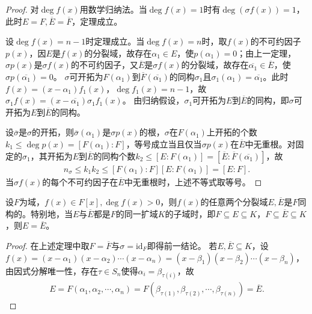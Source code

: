 \documentclass[../../main.tex]{subfiles}%
\begin{document}
\begin{proof}
对$\deg f(x)$用数学归纳法。当$\deg f(x)=1$时有$\deg(\sigma f(x))=1$，此时$E=F,\overline{E}=\overline{F}$，定理成立。

设$\deg f(x)=n-1$时定理成立。当$\deg f(x)=n$时，取$f(x)$的不可约因子$p(x)$，因$E$是$f(x)$的分裂域，故存在$\alpha_1\in E$，使$p(\alpha_1)=0$；由上一定理，$\sigma p(x)$是$\sigma f(x)$的不可约因子，又$\overline{E}$是$\sigma f(x)$的分裂域，故存在$\overline{\alpha_1}\in\overline{E}$，使$\sigma p(\overline{\alpha_1})=0$。
$\sigma$可开拓为$F(\alpha_1)$到$\overline{F}(\overline{\alpha_1})$的同构$\sigma_1$且$\sigma_1(\alpha_1)=\overline{\alpha_1}$。此时$f(x)=(x-\alpha_1)f_1(x)$，$\deg f_1(x)=n-1$，故$\sigma_1 f(x)=(x-\overline{\alpha_1})\sigma_1 f_1(x)$。
由归纳假设，$\sigma_1$可开拓为$E$到$\overline{E}$的同构，即$\sigma$可开拓为$E$到$\overline{E}$的同构。

设$\overline{\sigma}$是$\sigma$的开拓，则$\overline{\sigma}(\alpha_1)$是$\sigma p(x)$的根，$\sigma$在$F(\alpha_1)$上开拓的个数$k_1\leqslant\deg p(x)=[F(\alpha_1):F]$，等号成立当且仅当$\sigma p(x)$在$\overline{E}$中无重根。对固定的$\sigma_1$，其开拓为$E$到$\overline{E}$的同构个数$k_2\leqslant[E:F(\alpha_1)]=[\overline{E}:\overline{F}(\overline{\alpha_1})]$，故
\begin{align*}
n_\sigma\leqslant k_1k_2\leqslant[F(\alpha_1):F][E:F(\alpha_1)]=[E:F].
\end{align*}
当$\sigma f(x)$的每个不可约因子在$\overline{E}$中无重根时，上述不等式取等号。
\end{proof}

\begin{corollary}
设$F$为域，$f(x)\in F[x],\deg f(x)>0$，则$f(x)$的任意两个分裂域$E,\overline{E}$是$F$同构的。特别地，当$E$与$\overline{E}$都是$F$的同一扩域$K$的子域时，即$F\subseteq E\subseteq K$，$F\subseteq\overline{E}\subseteq K$，则$E=\overline{E}$。
\end{corollary}

\begin{proof}
在上述定理中取$F=\overline{F}$与$\sigma=\mathrm{id}_F$即得前一结论。
若$E,\overline{E}\subseteq K$，设$f(x)=(x-\alpha_1)(x-\alpha_2)\cdots(x-\alpha_n)=(x-\beta_1)(x-\beta_2)\cdots(x-\beta_n)$，由因式分解唯一性，存在$\tau\in S_n$使得$\alpha_i=\beta_{\tau(i)}$，故
\begin{align*}
E=F(\alpha_1,\alpha_2,\cdots,\alpha_n)=F(\beta_{\tau(1)},\beta_{\tau(2)},\cdots,\beta_{\tau(n)})=\overline{E}.
\end{align*}
\end{proof}
\end{document}
